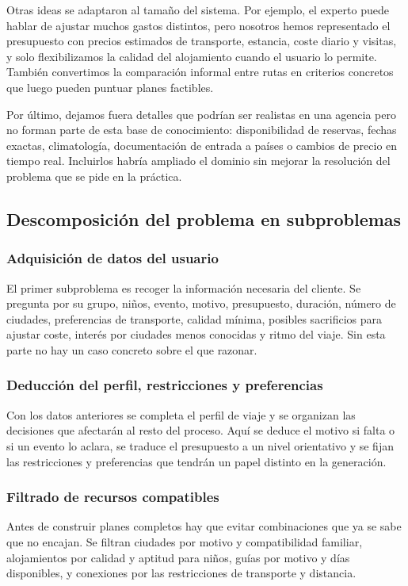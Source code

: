 \documentclass[11pt,a4paper]{article}
\begin{document}
Otras ideas se adaptaron al tama\~no del sistema. Por ejemplo, el experto puede
hablar de ajustar muchos gastos distintos, pero nosotros hemos representado el
presupuesto con precios estimados de transporte, estancia, coste diario y
visitas, y solo flexibilizamos la calidad del alojamiento cuando el usuario lo
permite. Tambi\'en convertimos la comparaci\'on informal entre rutas en criterios
concretos que luego pueden puntuar planes factibles.

Por \'ultimo, dejamos fuera detalles que podr\'ian ser realistas en una agencia
pero no forman parte de esta base de conocimiento: disponibilidad de reservas,
fechas exactas, climatolog\'ia, documentaci\'on de entrada a pa\'ises o cambios de
precio en tiempo real. Incluirlos habr\'ia ampliado el dominio sin mejorar la
resoluci\'on del problema que se pide en la pr\'actica.

\subsection{Descomposici\'on del problema en subproblemas}
\subsubsection{Adquisici\'on de datos del usuario}
El primer subproblema es recoger la informaci\'on necesaria del cliente. Se
pregunta por su grupo, ni\~nos, evento, motivo, presupuesto, duraci\'on, n\'umero
de ciudades, preferencias de transporte, calidad m\'inima, posibles sacrificios
para ajustar coste, inter\'es por ciudades menos conocidas y ritmo del viaje.
Sin esta parte no hay un caso concreto sobre el que razonar.

\subsubsection{Deducci\'on del perfil, restricciones y preferencias}
Con los datos anteriores se completa el perfil de viaje y se organizan las
decisiones que afectar\'an al resto del proceso. Aqu\'i se deduce el motivo si
falta o si un evento lo aclara, se traduce el presupuesto a un nivel orientativo
y se fijan las restricciones y preferencias que tendr\'an un papel distinto en
la generaci\'on.

\subsubsection{Filtrado de recursos compatibles}
Antes de construir planes completos hay que evitar combinaciones que ya se
sabe que no encajan. Se filtran ciudades por motivo y compatibilidad familiar,
alojamientos por calidad y aptitud para ni\~nos, gu\'ias por motivo y d\'ias
disponibles, y conexiones por las restricciones de transporte y distancia.
\end{document}
